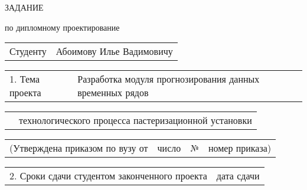 \documentclass[12pt, А4]{article} %
\begin{document}
    \begin{Center} %

        \fontsize{24}{30} \textsf{ЗАДАНИЕ}
        \par %
        \fontsize{14}{17.5} \textrm{по дипломному проектирование}

    \end{Center}  %


\fontsize{12}{15} %



    \begin{FlushLeft} %

    \begin{tabular}{p{2.2cm} p{14.65cm}} %
        \textsf{Студенту} & 
        \textsf{Абоимову Илье Вадимовичу} \vspace{1pt} \hline 
    \end{tabular} %

    \begin{tabular}{p{3.2cm} p{13.65cm}} %
        \textsf{1. Тема проекта} & 
        \textsf{Разработка модуля прогнозирования данных временных рядов} \vspace{1pt} \hline  
    \end{tabular} %


    \begin{tabular}{p{3.2cm} p{13.65cm}} %
        &
        \textsf{технологического процесса пастеризационной установки} \vspace{1pt} \hline 
    \end{tabular} %

    \begin{tabular}{p{7.0cm} p{3.8cm} p{0.5cm} p{4.7cm}} %
        \textsf{(Утверждена приказом по вузу от} &
        \centering \textsf{число} \vspace{1pt} \hline &
        \centering \textsf{№} &
        \centering \textsf{номер приказа)} \vspace{1pt} \hline
    \end{tabular} %

    \begin{tabular}{p{10.0cm} p{6.85cm}} %
        \textsf{2. Сроки сдачи студентом законченного проекта} &
        \centering \textsf{дата сдачи} \vspace{1pt} \hline
    \end{tabular} %


\end{FlushLeft}
\end{document}
